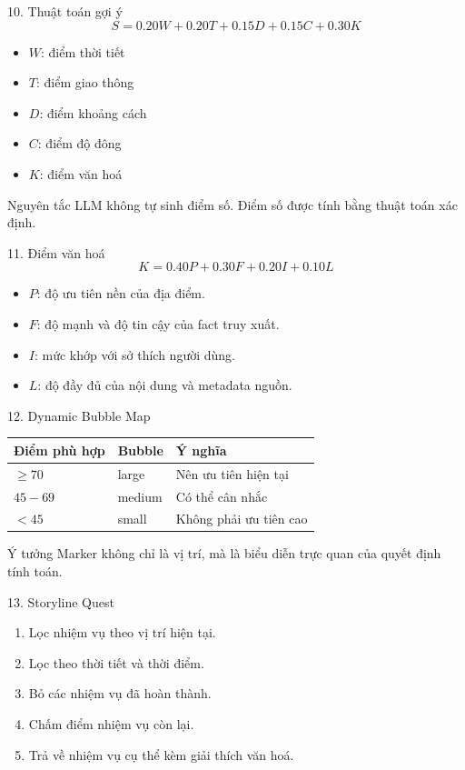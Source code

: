 \documentclass[aspectratio=169]{beamer}
\begin{document}
\begin{frame}{10. Thuật toán gợi ý}
\[
S = 0.20W + 0.20T + 0.15D + 0.15C + 0.30K
\]
\begin{itemize}
    \item $W$: điểm thời tiết
    \item $T$: điểm giao thông
    \item $D$: điểm khoảng cách
    \item $C$: điểm độ đông
    \item $K$: điểm văn hoá
\end{itemize}
\begin{block}{Nguyên tắc}
LLM không tự sinh điểm số. Điểm số được tính bằng thuật toán xác định.
\end{block}
\end{frame}

\begin{frame}{11. Điểm văn hoá}
\[
K = 0.40P + 0.30F + 0.20I + 0.10L
\]
\begin{itemize}
    \item $P$: độ ưu tiên nền của địa điểm.
    \item $F$: độ mạnh và độ tin cậy của fact truy xuất.
    \item $I$: mức khớp với sở thích người dùng.
    \item $L$: độ đầy đủ của nội dung và metadata nguồn.
\end{itemize}
\end{frame}

\begin{frame}{12. Dynamic Bubble Map}
\begin{tabular}{lll}
\toprule
\textbf{Điểm phù hợp} & \textbf{Bubble} & \textbf{Ý nghĩa}\\
\midrule
$\geq 70$ & large & Nên ưu tiên hiện tại\\
$45-69$ & medium & Có thể cân nhắc\\
$<45$ & small & Không phải ưu tiên cao\\
\bottomrule
\end{tabular}
\vspace{0.3cm}
\begin{block}{Ý tưởng}
Marker không chỉ là vị trí, mà là biểu diễn trực quan của quyết định tính toán.
\end{block}
\end{frame}

\begin{frame}{13. Storyline Quest}
\begin{enumerate}
    \item Lọc nhiệm vụ theo vị trí hiện tại.
    \item Lọc theo thời tiết và thời điểm.
    \item Bỏ các nhiệm vụ đã hoàn thành.
    \item Chấm điểm nhiệm vụ còn lại.
    \item Trả về nhiệm vụ cụ thể kèm giải thích văn hoá.
\end{enumerate}
\end{frame}
\end{document}
